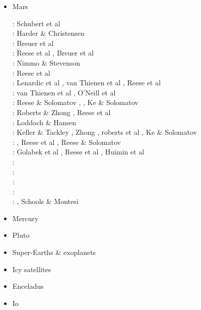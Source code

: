 \begin{itemize}
\item Mars \\
\begin{scriptsize}
\nineteenninety: Schubert et al \cite{scbg90}\\
\nineteenninetysix: Harder \& Christensen \cite{hach96}\\
\nineteenninetyseven: Breuer et al \cite{brys97}\\
\nineteenninetyeight: Reese et al \cite{resm98}, Breuer et al \cite{brys98}\\
\twothousandone: Nimmo \& Stevenson \cite{nist01}\\
\twothousandtwo: Reese et al \cite{resb02}\\
\twothousandfour: Lenardic et al \cite{lenm04}, van Thienen et al \cite{vavv04c}, 
                  Reese et al \cite{resb04}\\
\twothousandfive: van Thienen et al \cite{vavv05}, O'Neill et al \cite{onml05}\\
\twothousandsix: Reese \& Solomatov \cite{reso06}, \cite{losh06,rozh06}, Ke \& Solomatov \cite{keso06}\\
\twothousandseven: Roberts \& Zhong \cite{rozh07}, Reese et al \cite{reso07b}\\
\twothousandeight: Loddoch \& Hansen \cite{loha08}\\
\twothousandnine: Keller \& Tackley \cite{keta09}, Zhong \cite{zhon09}, 
                  roberts et al \cite{rolm09}, Ke \& Solomatov \cite{keso09}\\
\twothousandten: \cite{srzh10}, Reese et al \cite{reos10}, Reese \& Solomatov \cite{reso10}\\
\twothousandeleven: Golabek et al \cite{gokg11}, Reese et al \cite{reos11}, Huimin et al \cite{jizl11}\\
\twothousandtwelve: \cite{srzh12}\cite{roar12}\\
\twothousandthirteen: \cite{ruts13}\\
\twothousandfourteen: \cite{seki14}\\
\twothousandsixteen: \cite{zhon16,kili16}\\
\twothousandeighteen: \cite{cimt18,goej18}, Schools \& Montesi \cite{scmo18}
\end{scriptsize}

\item Mercury 
{\scriptsize
\cite{reki07,king08,roba12} 
}
\item Pluto 
{\scriptsize
\cite{mcnw16}
}
\item Super-Earths \& exoplanets 
{\scriptsize
\cite{stfl11}\cite{vata11}\cite{stlh13}\cite{welo15}\cite{miko15}\cite{kamo15}
}
\item Icy satellites  
{\scriptsize
\cite{kasc12b}
}
\item Enceladus  
{\scriptsize
\cite{roni08,betc10,hats12,robg14}
}
\item Io  
{\scriptsize
\cite{tasg01}
\cite{tack01}
}
\end{itemize}

